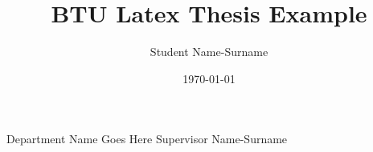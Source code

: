 \documentclass{btu_thesis}
\title{BTU Latex Thesis Example}
\author{Student Name-Surname}
\date{\today}
\begin{document}
	\startthesis

	\innercoverpage
		{Department Name Goes Here}
		{Supervisor Name-Surname}

	\startcontent
	
	
\end{document}
